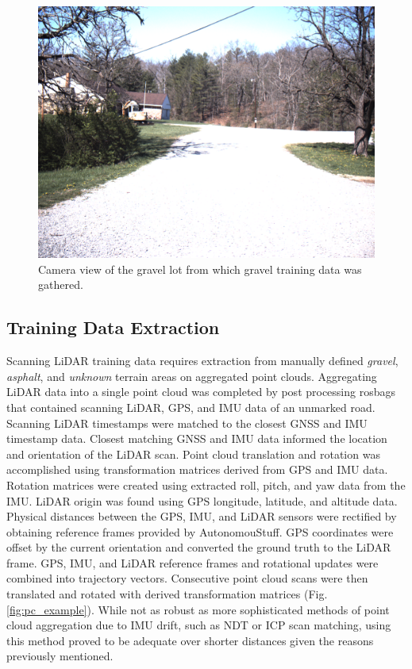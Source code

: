 \documentclass[journal,onecolumn]{IEEEtran}
\begin{document}
			\begin{figure}[H]
				\centering
				\includegraphics[width=0.75\linewidth]{figures/gravel_training_lot}
				\caption[Gravel Training Lot]{Camera view of the gravel lot from which gravel training data was gathered.}
				\label{fig:gravel_training_lot}
			\end{figure}			
	
		\subsection{Training Data Extraction}
	
			{Scanning LiDAR training data requires extraction from manually defined \textit{gravel}, \textit{asphalt}, and \textit{unknown} terrain areas on aggregated point clouds. Aggregating LiDAR data into a single point cloud was completed by post processing rosbags that contained scanning LiDAR, GPS, and IMU data of an unmarked road. Scanning LiDAR timestamps were matched to the closest GNSS and IMU timestamp data. Closest matching GNSS and IMU data informed the location and orientation of the LiDAR scan. Point cloud translation and rotation was accomplished using transformation matrices derived from GPS and IMU data. Rotation matrices were created using extracted roll, pitch, and yaw data from the IMU. LiDAR origin was found using GPS longitude, latitude, and altitude data. Physical distances between the GPS, IMU, and LiDAR sensors were rectified by obtaining reference frames provided by AutonomouStuff. GPS coordinates were offset by the current orientation and converted the ground truth to the LiDAR frame. GPS, IMU, and LiDAR reference frames and rotational updates were combined into trajectory vectors. Consecutive point cloud scans were then translated and rotated with derived transformation matrices (Fig. \ref{fig:pc_example}). While not as robust as more sophisticated methods of point cloud aggregation due to IMU drift, such as NDT or ICP scan matching, using this method proved to be adequate over shorter distances given the reasons previously mentioned.}
			
\end{document}
